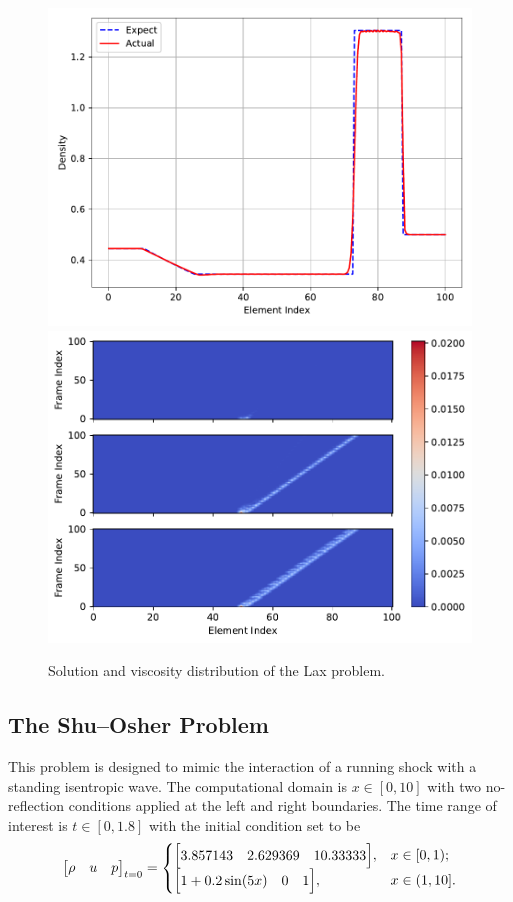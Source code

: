 \documentclass[10pt]{article}
\begin{document}
\begin{figure}[H]
  \centering
  \includegraphics[width=.49\textwidth]{./lax/Frame100.pdf}
  \includegraphics[width=.49\textwidth]{./lax/Viscosity.pdf}
  \caption{Solution and viscosity distribution of the Lax problem.}
  \label{fig:lax}
\end{figure}

\subsection{The Shu--Osher Problem}\label{sec:shu_osher}
This problem is designed to mimic the interaction of a running shock with a standing isentropic wave.
The computational domain is $x\in[0, 10]$ with two no-reflection conditions applied at the left and right boundaries.
The time range of interest is $t\in[0, 1.8]$ with the initial condition set to be
\begin{equation}
\mqty[\rho & u & p]_{t=0}
=
\begin{cases}
\mqty[3.857143 & 2.629369 & 10.33333], &x\in[0,1);\\
\mqty[1+0.2\sin(5x) & 0 & 1], &x\in(1,10].
\end{cases}
\end{equation}
\end{document}
